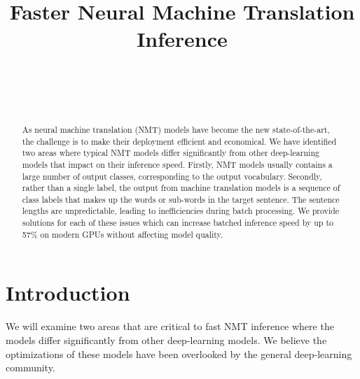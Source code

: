 \documentclass[11pt,a4paper]{article}
\begin{document}
\title{\bf Faster Neural Machine Translation Inference}  

\author{ \hfill  {}\\ 
        \addr{}
\AND
        \hfill {}\\
\AND
        \hfill {}\\
}

\maketitle
\pagestyle{empty}

\begin{abstract}

As neural machine translation (NMT) models have become the new state-of-the-art, the challenge is to make their deployment efficient and economical. We have identified two areas where typical NMT models differ significantly from other deep-learning models that impact on their inference speed. Firstly, NMT models usually contains a large number of output classes, corresponding to the output vocabulary. Secondly, rather than a single label, the output from machine translation models is a sequence of class labels that makes up the words or sub-words in the target sentence. The sentence lengths are unpredictable, leading to inefficiencies during batch processing. We provide solutions for each of these issues which can increase batched inference speed by up to 57\% on modern GPUs without affecting model quality.

\end{abstract}

\section{Introduction}
\label{sec:Introduction}

We will examine two areas that are critical to fast NMT inference where the models differ significantly from other deep-learning models. We believe the optimizations of these models have been overlooked by the general deep-learning community.
\end{document}
